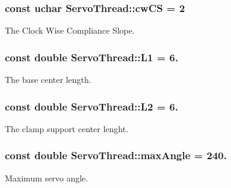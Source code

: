 \hypertarget{a00009_a67b2528edcaa375aefa1fb4117576665}{}
\subsubsection[{cw\+C\+S}]{\setlength{\rightskip}{0pt plus 5cm}const uchar Servo\+Thread\+::cw\+C\+S = 2\hspace{0.3cm}{\ttfamily [private]}}\label{a00009_a67b2528edcaa375aefa1fb4117576665}


The Clock Wise Compliance Slope. 

\hypertarget{a00009_a6281142e50115dd8c914c14cfae6f90d}{}
\subsubsection[{L1}]{\setlength{\rightskip}{0pt plus 5cm}const double Servo\+Thread\+::\+L1 = 6.\hspace{0.3cm}{\ttfamily [private]}}\label{a00009_a6281142e50115dd8c914c14cfae6f90d}


The base center length. 

\hypertarget{a00009_a3d51c16b1f498b48a6ecbfaadaba6ed2}{}
\subsubsection[{L2}]{\setlength{\rightskip}{0pt plus 5cm}const double Servo\+Thread\+::\+L2 = 6.\hspace{0.3cm}{\ttfamily [private]}}\label{a00009_a3d51c16b1f498b48a6ecbfaadaba6ed2}


The clamp support center lenght. 

\hypertarget{a00009_a77cc2aed4eff12967e346cb64f6be192}{}
\subsubsection[{max\+Angle}]{\setlength{\rightskip}{0pt plus 5cm}const double Servo\+Thread\+::max\+Angle = 240.\hspace{0.3cm}{\ttfamily [private]}}\label{a00009_a77cc2aed4eff12967e346cb64f6be192}


Maximum servo angle. 


